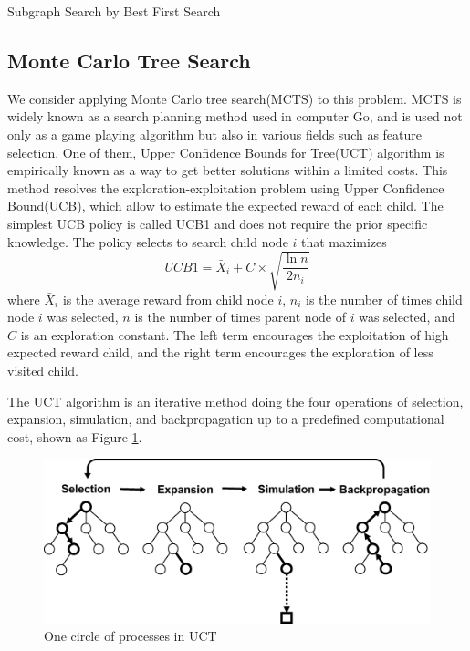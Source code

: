 \begin{algorithm2e}[H]
  \caption{Subgraph Search by Best First Search}
  \label{alg:bfs}
\end{algorithm2e}

\subsection{Monte Carlo Tree Search}
We consider applying Monte Carlo tree search(MCTS) 
\cite{Levente:2006, Romaric:2010, Cameron:2012} to this problem. 
MCTS is widely known as a search planning method used in computer Go, 
and is used not only as a game playing algorithm but also in various fields such as feature selection. 
One of them, Upper Confidence Bounds for Tree(UCT) algorithm 
\cite{Levente:2006} is empirically known as a way to get better solutions within a limited costs.
This method resolves the exploration-exploitation problem using Upper Confidence Bound(UCB),
which allow to estimate the expected reward of each child.
The simplest UCB policy is called UCB1 and does not require the prior specific knowledge.
The policy selects to search child node $i$ that maximizes
\begin{equation}
  \label{eq:ucb}
  UCB1 = \bar{X}_{i} + C \times \sqrt{\frac{\ln{n}}{2 n_{i}}}
\end{equation}
where $\bar{X}_{i}$ is the average reward from child node $i$, 
$n_{i}$ is the number of times child node $i$ was selected, 
$n$ is the number of times parent node of $i$ was selected,
and $C$ is an exploration constant.
The left term encourages the exploitation of high expected reward child,
and the right term encourages the exploration of less visited child.

The UCT algorithm is an iterative method 
doing the four operations of selection, expansion, 
simulation, and backpropagation up to a predefined computational cost, shown as Figure \ref{fig:MCTS}.
\begin{figure}[t]
  \centering
  \includegraphics[width=0.9\linewidth]{img/MCTS.eps}
  \caption{One circle of processes in UCT}
  \label{fig:MCTS}
\end{figure}



